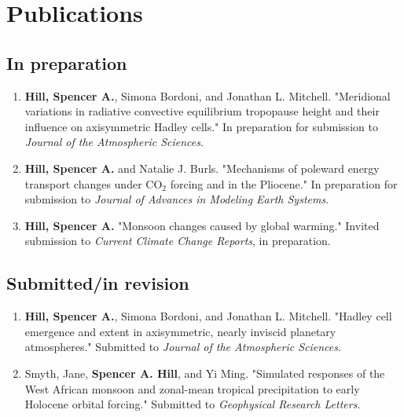 \documentclass[12pt,letterpaper]{shillcv}
\begin{document}
\section*{Publications}
\label{sec:org5f0dd44}
\subsection*{In preparation}
\label{sec:org4ab2bad}
\begin{enumerate}
\item \textbf{Hill, Spencer A.}, Simona Bordoni, and Jonathan L. Mitchell.  "Meridional
variations in radiative convective equilibrium tropopause height and their
influence on axisymmetric Hadley cells."  In preparation for submission to
\emph{Journal of the Atmospheric Sciences}.
\item \textbf{Hill, Spencer A.} and Natalie J. Burls.  "Mechanisms of poleward energy
transport changes under CO\(_2\) forcing and in the Pliocene."  In
preparation for submission to \emph{Journal of Advances in Modeling Earth
Systems}.
\item \textbf{Hill, Spencer A.}  "Monsoon changes caused by global warming."  Invited
submission to \emph{Current Climate Change Reports}, in preparation.
\end{enumerate}
\subsection*{Submitted/in revision}
\label{sec:orga4d1788}
\begin{enumerate}
\item \textbf{Hill, Spencer A.}, Simona Bordoni, and Jonathan L. Mitchell.  "Hadley cell
emergence and extent in axisymmetric, nearly inviscid planetary atmospheres."
Submitted to \emph{Journal of the Atmospheric Sciences}.
\item Smyth, Jane, \textbf{Spencer A. Hill}, and Yi Ming.  "Simulated responses of the
West African monsoon and zonal-mean tropical precipitation to early Holocene
orbital forcing."  Submitted to \emph{Geophysical Research Letters}.
\end{enumerate}
\end{document}

